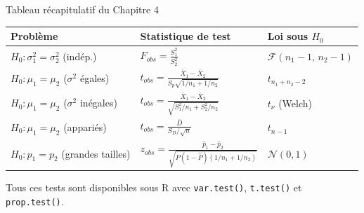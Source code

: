 \documentclass{BeamerTemplate}
\begin{document}
\begin{frame}[t]{Tableau récapitulatif du Chapitre 4}
  \centering
  \scriptsize
  \renewcommand{\arraystretch}{1.3}
  \begin{tabular}{lll}\toprule
    \textbf{Problème} & \textbf{Statistique de test} & \textbf{Loi sous $H_0$} \\ \midrule
    $H_0: \sigma_1^2 = \sigma_2^2$ (indép.) & $F_{obs} = \frac{S_1^2}{S_2^2}$ & $\mathcal{F}(n_1-1,\, n_2-1)$ \\[2mm]
    $H_0: \mu_1 = \mu_2$ ($\sigma^2$ égales) & $t_{obs} = \frac{\overline{X}_1 - \overline{X}_2}{S_p \sqrt{1/n_1 + 1/n_2}}$ & $t_{n_1+n_2-2}$ \\[2mm]
    $H_0: \mu_1 = \mu_2$ ($\sigma^2$ inégales) & $t_{obs} = \frac{\overline{X}_1 - \overline{X}_2}{\sqrt{S_1^2/n_1 + S_2^2/n_2}}$ & $t_\nu$ (Welch) \\[2mm]
    $H_0: \mu_1 = \mu_2$ (appariés) & $t_{obs} = \frac{\overline{D}}{S_D / \sqrt{n}}$ & $t_{n-1}$ \\[2mm]
    $H_0: p_1 = p_2$ (grandes tailles) & $z_{obs} = \frac{\hat{p}_1 - \hat{p}_2}{\sqrt{\widehat{P}(1-\widehat{P})(1/n_1 + 1/n_2)}}$ & $\mathcal{N}(0, 1)$ \\ \bottomrule
  \end{tabular}

  \bigskip
  \normalsize
  Tous ces tests sont disponibles sous R avec \texttt{var.test()}, \texttt{t.test()} et \texttt{prop.test()}.
\end{frame}
\end{document}
